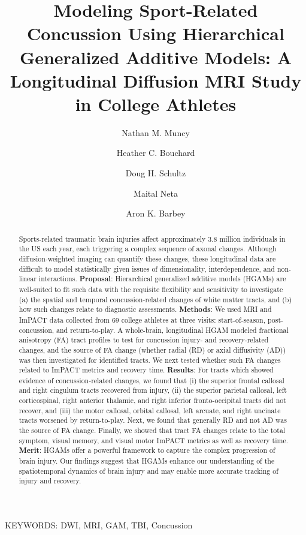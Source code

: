 \documentclass[12pt]{article}
\title{Modeling Sport-Related Concussion Using Hierarchical Generalized Additive Models: A Longitudinal Diffusion MRI Study in College Athletes}
\date{}
\author[1,2,*]{Nathan M. Muncy}
\author[1,2]{Heather C. Bouchard}
\author[1,2]{Doug H. Schultz}
\author[1,2]{Maital Neta}
\author[1,2]{Aron K. Barbey}
\affil[1]{Center for Brain, Behavior and Biology, University of Nebraska-Lincoln}
\affil[2]{Department of Psychology, University of Nebraska-Lincoln}
\affil[*]{Corresponding author.	Email: nmuncy2@unl.edu}
\begin{document}
\maketitle
\pagebreak


\begin{abstract}
Sports-related traumatic brain injuries affect approximately 3.8 million individuals in the US each year, each triggering a complex sequence of axonal changes. Although diffusion-weighted imaging can quantify these changes, these longitudinal data are difficult to model statistically given issues of dimensionality, interdependence, and non-linear interactions. \textbf{Proposal}: Hierarchical generalized additive models (HGAMs) are well-suited to fit such data with the requisite flexibility and sensitivity to investigate (a) the spatial and temporal concussion-related changes of white matter tracts, and (b) how such changes relate to diagnostic assessments. \textbf{Methods}: We used MRI and ImPACT data collected from 69 college athletes at three visits: start-of-season, post-concussion, and return-to-play. A whole-brain, longitudinal HGAM modeled fractional anisotropy (FA) tract profiles to test for concussion injury- and recovery-related changes, and the source of FA change (whether radial (RD) or axial diffusivity (AD)) was then investigated for identified tracts. We next tested whether such FA changes related to ImPACT metrics and recovery time. \textbf{Results}: For tracts which showed evidence of concussion-related changes, we found that (i) the superior frontal callosal and right cingulum tracts recovered from injury, (ii) the superior parietal callosal, left corticospinal, right anterior thalamic, and right inferior fronto-occipital tracts did not recover, and (iii) the motor callosal, orbital callosal, left arcuate, and right uncinate tracts worsened by return-to-play. Next, we found that generally RD and not AD was the source of FA change. Finally, we showed that tract FA changes relate to the total symptom, visual memory, and visual motor ImPACT metrics as well as recovery time. \textbf{Merit}: HGAMs offer a powerful framework to capture the complex progression of brain injury. Our findings suggest that HGAMs enhance our understanding of the spatiotemporal dynamics of brain injury and may enable more accurate tracking of injury and recovery.

\end{abstract}

\vfill
KEYWORDS: DWI, MRI, GAM, TBI, Concussion\\
\pagebreak
\end{document}
